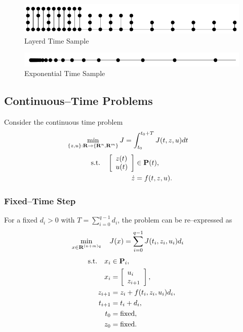\documentclass{article}
\begin{document}
    \begin{figure}[h!]
        \centering
        \includegraphics[width=.7\textwidth]{./figs/mpc/time_tree.png}
        \caption{Layerd Time Sample}
        \label{fig:time_tree}
    \end{figure}
    \begin{figure}[h!]
        \centering
        \includegraphics[width=.7\textwidth]{./figs/mpc/exp_sample.png}
        \caption{Exponential Time Sample}
        \label{fig:exp_time}
    \end{figure}

\clearpage

\subsection{Continuous--Time Problems}

    Consider the continuous time problem
    \begin{align*}
        \min_{\{z,u\}:\textbf{R}\to\{\textbf{R}^n,\textbf{R}^m\}} J &=\int_{t_0}^{t_0+T}  J (t,z,u)dt 
    \end{align*}
    \begin{align*}
        \text{s.t.} \quad \left[\begin{array}{lllllllllllllllllll}z(t)\\u(t)\end{array}\right]&\in\textbf{P}(t),\\
        \dot{z}&=f(t,z,u).
    \end{align*}

\subsubsection{Fixed--Time Step}

    For a fixed $d_i>0$ with $T=\sum_{i=0}^{q-1}d_i$, the problem can be re--expressed as
    \begin{align*}
        \min_{x\in\textbf{R}^{(n+m)q}}\quad J(x)&=\sum_{i=0}^{q-1}  J (t_i,z_i,u_i) d_i
    \end{align*}
    \begin{align*}
        \text{s.t.}\quad x_i&\in\textbf{P}_i,\\
        x_i&=\left[\begin{array}{lllllllllllllllllll}u_i\\z_{i+1}\end{array}\right],\\
        z_{i+1} &= z_i+f(t_i,z_i,u_i)d_i,\\
        t_{i+1} &=t_i + d_i,\\
        t_{0}&=\text{fixed},\\
        z_{0}&=\text{fixed}.
    \end{align*}
\end{document}

